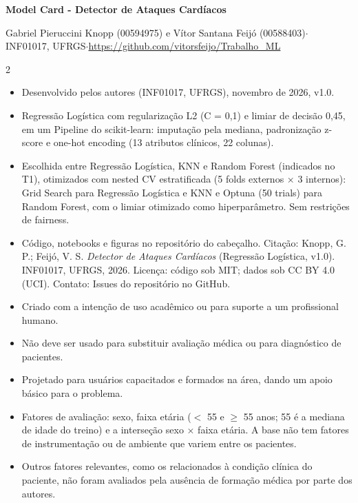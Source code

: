 \documentclass[10pt,a4paper]{article}
\newcommand{\secao}[1]{\par\vspace{5pt}{\normalsize\bfseries #1}\par\vspace{1pt}}
\begin{document}
\small

\begin{center}
{\Large\bfseries Model Card - Detector de Ataques Cardíacos}\par\vspace{2pt}
{\footnotesize Gabriel Pieruccini Knopp (00594975) e Vítor Santana Feijó (00588403)\enspace$\cdot$\enspace
INF01017, UFRGS\enspace$\cdot$\enspace \url{https://github.com/vitorsfeijo/Trabalho_ML}}
\end{center}
\vspace{-4pt}

\begin{paracol}{2}

\secao{Detalhes do Modelo}
\begin{itemize}
\item Desenvolvido pelos autores (INF01017, UFRGS), novembro de 2026, v1.0.
\item Regressão Logística com regularização L2 (C = 0,1) e limiar de decisão 0,45, em um Pipeline do scikit-learn: imputação pela mediana, padronização z-score e one-hot encoding (13 atributos clínicos, 22 colunas).
\item Escolhida entre Regressão Logística, KNN e Random Forest (indicados no T1), otimizados com nested CV estratificada (5 folds externos $\times$ 3 internos): Grid Search para Regressão Logística e KNN e Optuna (50 trials) para Random Forest, com o limiar otimizado como hiperparâmetro. Sem restrições de fairness.
\item Código, notebooks e figuras no repositório do cabeçalho. Citação: Knopp, G. P.; Feijó, V. S. \textit{Detector de Ataques Cardíacos} (Regressão Logística, v1.0). INF01017, UFRGS, 2026. Licença: código sob MIT; dados sob CC BY 4.0 (UCI). Contato: Issues do repositório no GitHub.

\end{itemize}

\secao{Uso Pretendido}
\begin{itemize}
\item Criado com a intenção de uso acadêmico ou para suporte a um profissional humano.
\item Não deve ser usado para substituir avaliação médica ou para diagnóstico de pacientes.
\item Projetado para usuários capacitados e formados na área, dando um apoio básico para o problema. 
\end{itemize}

\secao{Fatores}
\begin{itemize}
\item Fatores de avaliação: sexo, faixa etária ($<$ 55 e $\geq$ 55 anos; 55 é a mediana de idade do treino) e a interseção sexo $\times$ faixa etária. A base não tem fatores de instrumentação ou de ambiente que variem entre os pacientes.
\item Outros fatores relevantes, como os relacionados à condição clínica do paciente, não foram avaliados pela ausência de formação médica por parte dos autores.
\end{itemize}


\end{paracol}
\end{document}

